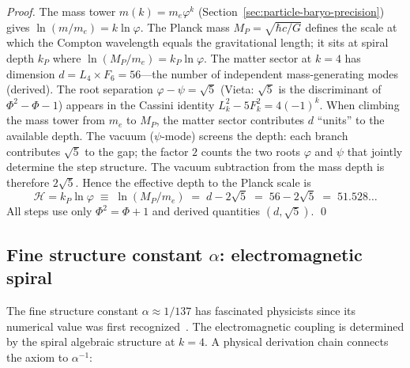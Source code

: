\documentclass[12pt,a4paper]{article}
\begin{document}
\begin{proof}
The mass tower $m(k) = m_e \varphi^k$ (Section~\ref{sec:particle-baryo-precision}) gives $\ln(m/m_e) = k \ln\varphi$. The Planck mass $M_P = \sqrt{\hbar c/G}$ defines the scale at which the Compton wavelength equals the gravitational length; it sits at spiral depth $k_P$ where $\ln(M_P/m_e) = k_P \ln\varphi$. The matter sector at $k = 4$ has dimension $d = L_4 \times F_6 = 56$---the number of independent mass-generating modes (derived). The root separation $\varphi - \psi = \sqrt{5}$ (Vieta: $\sqrt{5}$ is the discriminant of $\Phi^2 - \Phi - 1$) appears in the Cassini identity $L_k^2 - 5F_k^2 = 4(-1)^k$. When climbing the mass tower from $m_e$ to $M_P$, the matter sector contributes $d$ ``units'' to the available depth. The vacuum ($\psi$-mode) screens the depth: each branch contributes $\sqrt{5}$ to the gap; the factor $2$ counts the two roots $\varphi$ and $\psi$ that jointly determine the step structure. The vacuum subtraction from the mass depth is therefore $2\sqrt{5}$. Hence the effective depth to the Planck scale is
\begin{equation}
\mathcal{H} = k_P \ln\varphi \;\equiv\; \ln(M_P/m_e) \;=\; d - 2\sqrt{5} \;=\; 56 - 2\sqrt{5} \;=\; 51.528\ldots
\end{equation}
All steps use only $\Phi^2 = \Phi + 1$ and derived quantities $(d, \sqrt{5})$. \qed
\end{proof}

\subsection{Fine structure constant $\alpha$: electromagnetic spiral}
\label{sec:alpha-derivation}

The fine structure constant $\alpha \approx 1/137$ has fascinated physicists since its numerical value was first recognized~\cite{Dirac1937,Feynman1985}. The electromagnetic coupling is determined by the spiral algebraic structure at $k = 4$. A physical derivation chain connects the axiom to $\alpha^{-1}$:
\end{document}

